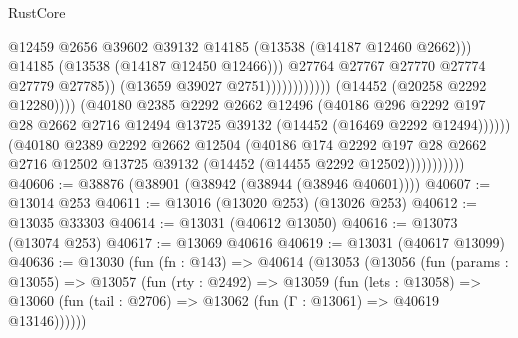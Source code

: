 \begin{lexlean}{RustCore}
\begin{coremodule}
                                                        @12459
                                                        @2656
                                                        @39602
                                                        @39132
                                                        @14185
                                                        (@13538 (@14187 @12460 @2662)))
                                                      @14185
                                                      (@13538 (@14187 @12450 @12466)))
                                                    @27764
                                                    @27767
                                                    @27770
                                                    @27774
                                                    @27779
                                                    @27785))
                                                (@13659 @39027 @2751))))))))))))
                          (@14452 (@20258 @2292 @12280))))
                      (@40180
                        @2385
                        @2292
                        @2662
                        @12496
                        (@40186
                          @296
                          @2292
                          @197
                          @28
                          @2662
                          @2716
                          @12494
                          @13725
                          @39132
                          (@14452 (@16469 @2292 @12494))))))
                  (@40180
                    @2389
                    @2292
                    @2662
                    @12504
                    (@40186
                      @174
                      @2292
                      @197
                      @28
                      @2662
                      @2716
                      @12502
                      @13725
                      @39132
                      (@14452 (@14455 @2292 @12502)))))))))))
@40606 := @38876 (@38901 (@38942 (@38944 (@38946 @40601))))
@40607 := @13014 @253
@40611 := @13016 (@13020 @253) (@13026 @253)
@40612 := @13035 @33303
@40614 := @13031 (@40612 @13050)
@40616 := @13073 (@13074 @253)
@40617 := @13069 @40616
@40619 := @13031 (@40617 @13099)
@40636 := @13030
    (fun (fn : @143) =>
    @40614
      (@13053
        (@13056
          (fun (params : @13055) =>
          @13057
            (fun (rty : @2492) =>
            @13059
              (fun (lets : @13058) =>
              @13060 (fun (tail : @2706) => @13062 (fun (Γ : @13061) => @40619 @13146))))))

\end{coremodule}
\end{lexlean}
